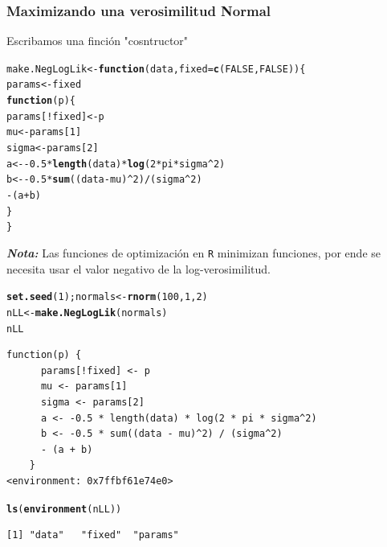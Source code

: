 \documentclass{article}\usepackage[]{graphicx}\usepackage[]{color}
\makeatletter
\newcommand{\hlnum}[1]{\textcolor[rgb]{0.686,0.059,0.569}{#1}}%
\newcommand{\hlopt}[1]{\textcolor[rgb]{0,0,0}{#1}}%
\newcommand{\hlstd}[1]{\textcolor[rgb]{0.345,0.345,0.345}{#1}}%
\newcommand{\hlkwa}[1]{\textcolor[rgb]{0.161,0.373,0.58}{\textbf{#1}}}%
\newcommand{\hlkwb}[1]{\textcolor[rgb]{0.69,0.353,0.396}{#1}}%
\newcommand{\hlkwc}[1]{\textcolor[rgb]{0.333,0.667,0.333}{#1}}%
\newcommand{\hlkwd}[1]{\textcolor[rgb]{0.737,0.353,0.396}{\textbf{#1}}}%
\newenvironment{kframe}{%
 \def\at@end@of@kframe{}%
 \ifinner\ifhmode%
  \def\at@end@of@kframe{\end{minipage}}%
  \begin{minipage}{\columnwidth}%
 \fi\fi%
 \def\FrameCommand##1{\hskip\@totalleftmargin \hskip-\fboxsep
 \colorbox{shadecolor}{##1}\hskip-\fboxsep
     \hskip-\linewidth \hskip-\@totalleftmargin \hskip\columnwidth}%
 \MakeFramed {\advance\hsize-\width
   \@totalleftmargin\z@ \linewidth\hsize
   \@setminipage}}%
 {\par\unskip\endMakeFramed%
 \at@end@of@kframe}
\newenvironment{knitrout}{}{} %
\makeatother
\begin{document}
  \subsubsection{Maximizando una verosimilitud Normal}
  Escribamos una finción "cosntructor"
\begin{knitrout}
\color{fgcolor}\begin{kframe}
\begin{alltt}
  \hlstd{make.NegLogLik} \hlkwb{<-} \hlkwa{function}\hlstd{(}\hlkwc{data}\hlstd{,} \hlkwc{fixed}\hlstd{=}\hlkwd{c}\hlstd{(}\hlnum{FALSE}\hlstd{,} \hlnum{FALSE}\hlstd{)) \{}
    \hlstd{params} \hlkwb{<-} \hlstd{fixed}
    \hlkwa{function}\hlstd{(}\hlkwc{p}\hlstd{) \{}
      \hlstd{params[}\hlopt{!}\hlstd{fixed]} \hlkwb{<-} \hlstd{p}
      \hlstd{mu} \hlkwb{<-} \hlstd{params[}\hlnum{1}\hlstd{]}
      \hlstd{sigma} \hlkwb{<-} \hlstd{params[}\hlnum{2}\hlstd{]}
      \hlstd{a} \hlkwb{<-} \hlopt{-}\hlnum{0.5} \hlopt{*} \hlkwd{length}\hlstd{(data)} \hlopt{*} \hlkwd{log}\hlstd{(}\hlnum{2} \hlopt{*} \hlstd{pi} \hlopt{*} \hlstd{sigma}\hlopt{^}\hlnum{2}\hlstd{)}
      \hlstd{b} \hlkwb{<-} \hlopt{-}\hlnum{0.5} \hlopt{*} \hlkwd{sum}\hlstd{((data} \hlopt{-} \hlstd{mu)}\hlopt{^}\hlnum{2}\hlstd{)} \hlopt{/} \hlstd{(sigma}\hlopt{^}\hlnum{2}\hlstd{)}
      \hlopt{-} \hlstd{(a} \hlopt{+} \hlstd{b)}
    \hlstd{\}}
  \hlstd{\}}
\end{alltt}
\end{kframe}
\end{knitrout}
  \textbf{\emph{Nota:}} Las funciones de optimización en \texttt{R} minimizan funciones, por ende se necesita usar el valor negativo de la log-verosimilitud.
\begin{knitrout}
\color{fgcolor}\begin{kframe}
\begin{alltt}
  \hlkwd{set.seed}\hlstd{(}\hlnum{1}\hlstd{); normals} \hlkwb{<-} \hlkwd{rnorm}\hlstd{(}\hlnum{100}\hlstd{,} \hlnum{1}\hlstd{,} \hlnum{2}\hlstd{)}
  \hlstd{nLL} \hlkwb{<-} \hlkwd{make.NegLogLik}\hlstd{(normals)}
  \hlstd{nLL}
\end{alltt}
\begin{verbatim}
function(p) {
      params[!fixed] <- p
      mu <- params[1]
      sigma <- params[2]
      a <- -0.5 * length(data) * log(2 * pi * sigma^2)
      b <- -0.5 * sum((data - mu)^2) / (sigma^2) 
      - (a + b)
    }
<environment: 0x7ffbf61e74e0>
\end{verbatim}
\begin{alltt}
  \hlkwd{ls}\hlstd{(}\hlkwd{environment}\hlstd{(nLL))}
\end{alltt}
\begin{verbatim}
[1] "data"   "fixed"  "params"
\end{verbatim}
\end{kframe}
\end{knitrout}
\end{document}
